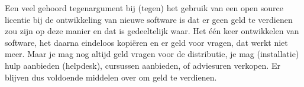 Een veel gehoord tegenargument bij (tegen) het gebruik van een open source licentie bij de ontwikkeling
van nieuwe software is dat er geen geld te verdienen zou zijn op deze manier en dat is gedeeltelijk waar. Het \'e\'en keer
ontwikkelen van software, het daarna eindeloos kopi\"eren en er geld voor vragen, dat werkt niet meer. Maar je mag nog
altijd geld vragen voor de distributie, je mag (installatie) hulp aanbieden (helpdesk), cursussen aanbieden, of adviesuren verkopen. Er blijven dus voldoende middelen over om geld te verdienen.
